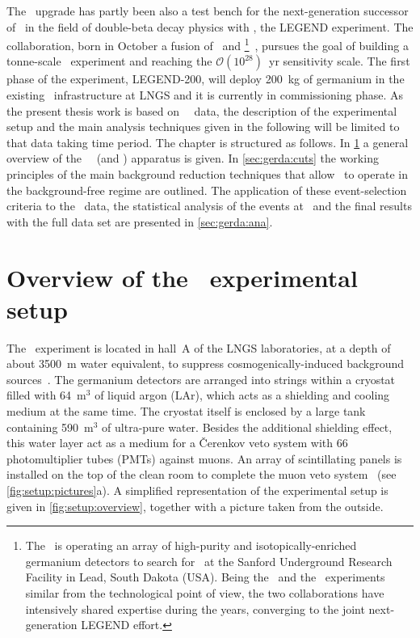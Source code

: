 \newpar
The \phasetwop\ upgrade has partly been also a test bench for the next-generation successor of
\gerda\ in the field of double-beta decay physics with \gesix, the LEGEND experiment. The
collaboration, born in October  a fusion of \gerda\ and
\majorana\footnote{%
  The \majoranademo\ is operating an array of high-purity and isotopically-enriched
  germanium detectors to search for \onbb\ at the Sanford Underground Research Facility
  in Lead, South Dakota (USA). Being the \majoranademo\ and the \gerda\ experiments
  similar from the technological point of view, the two collaborations have intensively
  shared expertise during the years, converging to the joint next-generation LEGEND effort.
}~\cite{Abgrall2014}, pursues the goal of building a tonne-scale \gesix\ experiment and
reaching the $\mathcal{O}(10^{28})$~yr sensitivity scale. The first phase of the
experiment, LEGEND-200, will deploy 200~kg of germanium in the existing \gerda\
infrastructure at LNGS and it is currently in commissioning phase.
\newpar
As the present thesis work is based on \gerda\ \phasetwo\ data, the description of the
experimental setup and the main analysis techniques given in the following will be limited
to that data taking time period. The chapter is structured as follows. In
\cref{sec:gerda:setup} a general overview of the \gerda\ \phasetwo\ (and \phasetwop)
apparatus is given. In \cref{sec:gerda:cuts} the working principles of the main background
reduction techniques that allow \gerda\ to operate in the background-free regime are
outlined. The application of these event-selection criteria to the \phasetwo\ data, the
statistical analysis of the events at \qbb\ and the final results with the full data set
are presented in \cref{sec:gerda:ana}.

\section{Overview of the \phasetwo\ experimental setup}%
\label{sec:gerda:setup}

The \gerda\ experiment is located in hall~A of the LNGS laboratories, at a depth of about
3500~m water equivalent, to suppress cosmogenically-induced background
sources~\cite{Wiesinger2018}. The germanium detectors are arranged into strings within a
cryostat filled with 64~m$^3$ of liquid argon (LAr), which acts as a shielding and cooling
medium at the same time. The cryostat itself is enclosed by a large tank containing
590~m$^3$ of ultra-pure water.  Besides the additional shielding effect, this water layer
act as a medium for a \v{C}erenkov veto system with 66 photomultiplier tubes (PMTs)
against muons. An array of scintillating panels is installed on the top of the clean room
to complete the muon veto system~\cite{Freund2016} (see \cref{fig:setup:pictures}a). A
simplified representation of the experimental setup is given in \cref{fig:setup:overview},
together with a picture taken from the outside.

